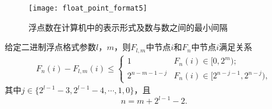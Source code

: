 \begin{figure}[!htb]
\centering
\begin{minipage}{1.15\BigOneImW}
\centering
\texttt{[image: float\_point\_format5]}
\end{minipage}
\caption{浮点数在计算机中的表示形式及数与数之间的最小间隔}
\label{fig:float_point_format5}
\end{figure}

\begin{theorem}
给定二进制浮点格式参数$l$，$m$，则$F_{l,m}$中节点$i$和$F_{n}$中节点$i$满足关系
\begin{eqnarray}
F_{n}(i)- F_{l, m}(i)
\le
\begin{cases}
1               &  F_{n}(i)\in [0,2^{m});    \\
2^{n-m-1-j}     &  F_{n}(i)\in [2^{n-j-1},2^{n-j}),
\end{cases}
\end{eqnarray}
其中$j\in \{2^{l-1}-3, 2^{l-1}-4, \cdots, 1, 0\}$，且
\begin{equation}
\label{condition}
n = m+2^{l-1}-2.
\end{equation}
\label{theorem:fixedFloat}
\end{theorem}
